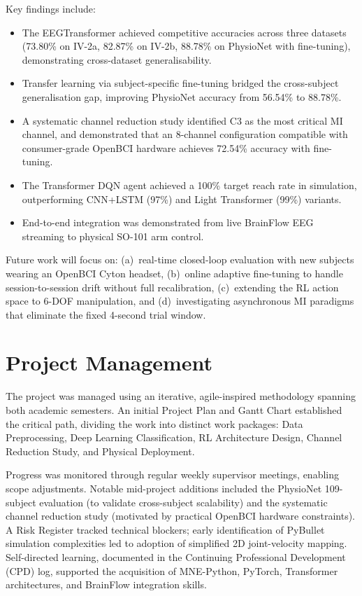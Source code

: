 \documentclass[12pt, a4paper]{article}
\begin{document}
Key findings include:
\begin{itemize}
    \item The EEGTransformer achieved competitive accuracies across three datasets (73.80\% on IV-2a, 82.87\% on IV-2b, 88.78\% on PhysioNet with fine-tuning), demonstrating cross-dataset generalisability.
    \item Transfer learning via subject-specific fine-tuning bridged the cross-subject generalisation gap, improving PhysioNet accuracy from 56.54\% to 88.78\%.
    \item A systematic channel reduction study identified C3 as the most critical MI channel, and demonstrated that an 8-channel configuration compatible with consumer-grade OpenBCI hardware achieves 72.54\% accuracy with fine-tuning.
    \item The Transformer DQN agent achieved a 100\% target reach rate in simulation, outperforming CNN+LSTM (97\%) and Light Transformer (99\%) variants.
    \item End-to-end integration was demonstrated from live BrainFlow EEG streaming to physical SO-101 arm control.
\end{itemize}

Future work will focus on: (a)~real-time closed-loop evaluation with new subjects wearing an OpenBCI Cyton headset, (b)~online adaptive fine-tuning to handle session-to-session drift without full recalibration, (c)~extending the RL action space to 6-DOF manipulation, and (d)~investigating asynchronous MI paradigms that eliminate the fixed 4-second trial window.

\section{Project Management}

The project was managed using an iterative, agile-inspired methodology spanning both academic semesters. An initial Project Plan and Gantt Chart established the critical path, dividing the work into distinct work packages: Data Preprocessing, Deep Learning Classification, RL Architecture Design, Channel Reduction Study, and Physical Deployment.

Progress was monitored through regular weekly supervisor meetings, enabling scope adjustments. Notable mid-project additions included the PhysioNet 109-subject evaluation (to validate cross-subject scalability) and the systematic channel reduction study (motivated by practical OpenBCI hardware constraints). A Risk Register tracked technical blockers; early identification of PyBullet simulation complexities led to adoption of simplified 2D joint-velocity mapping. Self-directed learning, documented in the Continuing Professional Development (CPD) log, supported the acquisition of MNE-Python, PyTorch, Transformer architectures, and BrainFlow integration skills.
\end{document}
